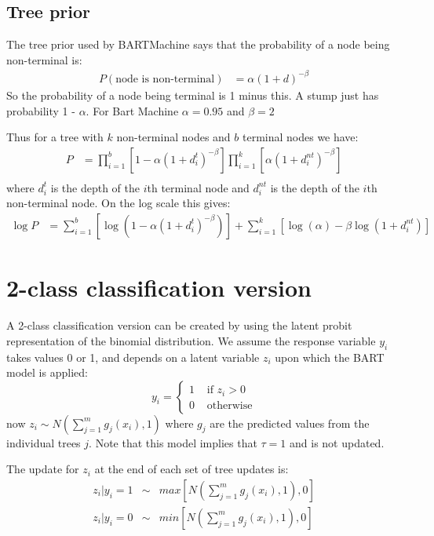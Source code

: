 \documentclass{article}
\begin{document}
\subsection*{Tree prior}

The tree prior used by BARTMachine says that the probability of a node being non-terminal is:
\begin{align*}
P(\mbox{node is non-terminal}) &= \alpha (1 + d)^{-\beta}
\end{align*}
So the probability of a node being terminal is 1 minus this. A stump just has probability 1 - $\alpha$. For Bart Machine $\alpha = 0.95$ and $\beta = 2$

Thus for a tree with $k$ non-terminal nodes and $b$ terminal nodes we have:
\begin{align*}
P &= \prod_{i=1}^b \left[ 1 - \alpha (1 + d^t_i)^{-\beta} \right] \prod_{i=1}^k \left[ \alpha (1 + d^{nt}_i)^{-\beta} \right] \\
\end{align*}
where $d^t_i$ is the depth of the $i$th terminal node and $d^{nt}_i$ is the depth of the $i$th non-terminal node.
On the log scale this gives:
\begin{align}
\log P &= \sum_{i=1}^b \left[ \log \left(1 - \alpha(1 + d^t_i)^{-\beta} \right) \right] + \sum_{i=1}^k \left[ \log(\alpha) - \beta \log(1 + d^{nt}_i) \right]
\end{align}

\section*{2-class classification version}

A 2-class classification version can be created by using the latent probit representation of the binomial distribution. We assume the response variable $y_i$ takes values 0 or 1, and depends on a latent variable $z_i$ upon which the BART model is applied:
$$y_i = \left\{ \begin{array}{ll} 1 & \mbox{ if } z_i > 0 \\ 0 & \mbox{ otherwise} \end{array} \right.$$
now $z_i \sim N \left(\sum_{j=1}^m g_j(x_i), 1\right)$ where $g_j$ are the predicted values from the individual trees $j$. Note that this model implies that $\tau = 1$ and is not updated.

The update for $z_i$ at the end of each set of tree updates is:
\begin{eqnarray}
z_i | y_i = 1 &\sim& max \left[ N\left(\sum_{j=1}^m g_j(x_i), 1\right), 0 \right] \\
z_i | y_i = 0 &\sim& min \left[ N\left(\sum_{j=1}^m g_j(x_i), 1\right), 0 \right]
\end{eqnarray}
\end{document}
